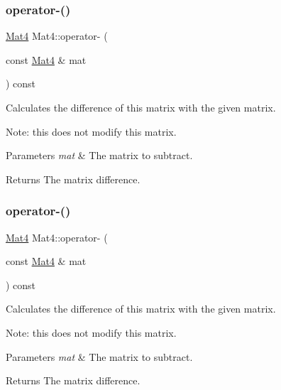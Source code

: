 \subsubsection{\texorpdfstring{operator-\/()}{operator-()}\hspace{0.1cm}{\footnotesize\ttfamily [1/4]}}
{\footnotesize\ttfamily \hyperlink{classMat4}{Mat4} Mat4\+::operator-\/ (\begin{DoxyParamCaption}\item[{const \hyperlink{classMat4}{Mat4} \&}]{mat }\end{DoxyParamCaption}) const\hspace{0.3cm}{\ttfamily [inline]}}

Calculates the difference of this matrix with the given matrix.

Note\+: this does not modify this matrix.


\begin{DoxyParams}{Parameters}
{\em mat} & The matrix to subtract. \\
\hline
\end{DoxyParams}
\begin{DoxyReturn}{Returns}
The matrix difference. 
\end{DoxyReturn}
\mbox{\label{classMat4_ae56d2c741f3bafc30024da58083bb8f4}} 
\subsubsection{\texorpdfstring{operator-\/()}{operator-()}\hspace{0.1cm}{\footnotesize\ttfamily [2/4]}}
{\footnotesize\ttfamily \hyperlink{classMat4}{Mat4} Mat4\+::operator-\/ (\begin{DoxyParamCaption}\item[{const \hyperlink{classMat4}{Mat4} \&}]{mat }\end{DoxyParamCaption}) const\hspace{0.3cm}{\ttfamily [inline]}}

Calculates the difference of this matrix with the given matrix.

Note\+: this does not modify this matrix.


\begin{DoxyParams}{Parameters}
{\em mat} & The matrix to subtract. \\
\hline
\end{DoxyParams}
\begin{DoxyReturn}{Returns}
The matrix difference. 
\end{DoxyReturn}
\mbox{\label{classMat4_a23ddc905ed3d3400c62cb6f60f8577e2}} 
